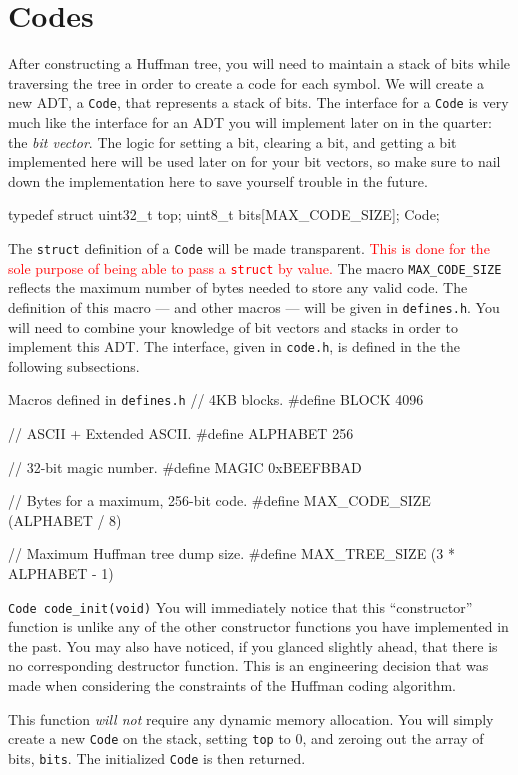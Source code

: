 \section{Codes}

After constructing a Huffman tree, you will need to maintain a stack of
bits while traversing the tree in order to create a code for each
symbol. We will create a new ADT, a \texttt{Code}, that represents a
stack of bits. The interface for a \texttt{Code} is very much like the
interface for an ADT you will implement later on in the quarter: the
\emph{bit vector}. The logic for setting a bit, clearing a bit, and
getting a bit implemented here will be used later on for your bit
vectors, so make sure to nail down the implementation here to save
yourself trouble in the future.

\begin{clisting}{}
typedef struct {
    uint32_t top;
    uint8_t bits[MAX_CODE_SIZE];
} Code;
\end{clisting}

The \texttt{struct} definition of a \texttt{Code} will be made
transparent. \textcolor{red}{This is done for the sole purpose of being
able to pass a \texttt{struct} by value.} The macro
\texttt{MAX\_CODE\_SIZE} reflects the maximum number of bytes needed to
store any valid code. The definition of this macro --- and other macros
--- will be given in \texttt{defines.h}. You will need to combine your
knowledge of bit vectors and stacks in order to implement this ADT. The
interface, given in \texttt{code.h}, is defined in the the following
subsections.

\begin{clisting}{Macros defined in \texttt{defines.h}}
// 4KB blocks.
#define BLOCK 4096

// ASCII + Extended ASCII.
#define ALPHABET 256

// 32-bit magic number.
#define MAGIC 0xBEEFBBAD

// Bytes for a maximum, 256-bit code.
#define MAX_CODE_SIZE (ALPHABET / 8)

// Maximum Huffman tree dump size.
#define MAX_TREE_SIZE (3 * ALPHABET - 1)
\end{clisting}

\begin{funcdoc}{\texttt{Code code\_init(void)}}
  You will immediately notice that this ``constructor'' function is
  unlike any of the other constructor functions you have implemented in
  the past. You may also have noticed, if you glanced slightly ahead,
  that there is no corresponding destructor function. This is an
  engineering decision that was made when considering the constraints of
  the Huffman coding algorithm.

  This function \emph{will not} require any dynamic memory allocation.
  You will simply create a new \texttt{Code} on the stack, setting
  \texttt{top} to 0, and zeroing out the array of bits, \texttt{bits}.
  The initialized \texttt{Code} is then returned.
\end{funcdoc}

